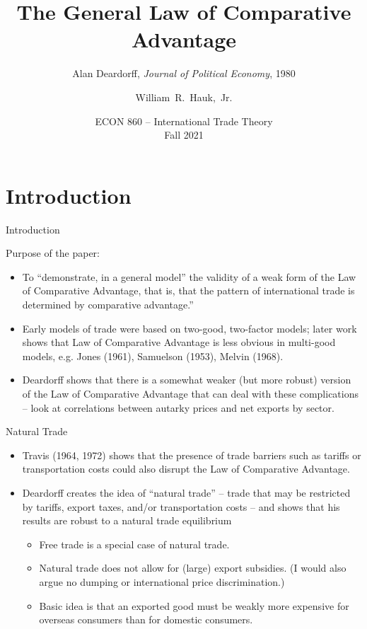 \documentclass[aspectratio=169]{beamer}
\title[Deardorff (1980)] %
{The General Law of Comparative Advantage}
\subtitle{Alan Deardorff, \emph{Journal of Political Economy}, 1980}
\author [Hauk] %
{William~R.~Hauk,~Jr.} %
\institute[UofSC] %
{
  Darla Moore School of Business\\
  University of South Carolina
}
\date[ECON 860, Fall 2021] %
{ECON 860 -- International Trade Theory\\Fall 2021}
\begin{document}
\frame{\titlepage}

\section{Introduction}
\begin{frame}{Introduction}

Purpose of the paper:

\begin{itemize}
    \item<1-> To ``demonstrate, in a general model” the validity of a weak form of the Law of Comparative Advantage, that is, that the pattern of international trade is determined by comparative advantage.” 
    \item<2-> Early models of trade were based on two-good, two-factor models; later work shows that Law of Comparative Advantage is less obvious in multi-good models, e.g. Jones (1961), Samuelson (1953), Melvin (1968).
    \item<3-> Deardorff shows that there is a somewhat weaker (but more robust) version of the Law of Comparative Advantage that can deal with these complications – look at correlations between autarky prices and net exports by sector.
\end{itemize}
    
\end{frame}


\begin{frame}{Natural Trade}

\begin{itemize}
    \item<1-> Travis (1964, 1972) shows that the presence of trade barriers such as tariffs or transportation costs could also disrupt the Law of Comparative Advantage.
    \item<2-> Deardorff creates the idea of ``natural trade” – trade that may be restricted by tariffs, export taxes, and/or transportation costs – and shows that his results are robust to a natural trade equilibrium
    \begin{itemize}
        \item<3-> Free trade is a special case of natural trade. 
        \item<4-> Natural trade does not allow for (large) export subsidies.  (I would also argue no dumping or international price discrimination.)
        \item<5-> Basic idea is that an exported good must be weakly more expensive for overseas consumers than for domestic consumers.
    \end{itemize}
\end{itemize}
    
\end{frame}
\end{document}

